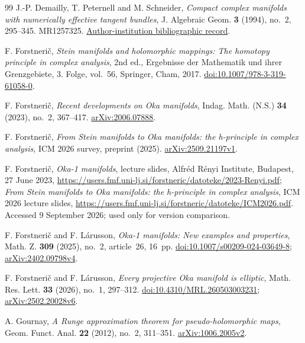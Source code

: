 \documentclass[12pt]{amsart}
\theoremstyle{definition}
\theoremstyle{remark}
\numberwithin{equation}{section}
\begin{document}
\begin{thebibliography}{99}
J.-P. Demailly, T. Peternell and M. Schneider,
\emph{Compact complex manifolds with numerically effective tangent bundles},
J. Algebraic Geom. \textbf{3} (1994), no.~2, 295--345. MR1257325.
\href{https://eref.uni-bayreuth.de/id/eprint/59615/}{Author-institution bibliographic record}.

F. Forstneri\v c,
\emph{Stein manifolds and holomorphic mappings: The homotopy principle in complex analysis},
2nd ed., Ergebnisse der Mathematik und ihrer Grenzgebiete, 3. Folge, vol.~56,
Springer, Cham, 2017.
\href{https://doi.org/10.1007/978-3-319-61058-0}{doi:10.1007/978-3-319-61058-0}.

F. Forstneri\v c, \emph{Recent developments on Oka manifolds},
Indag. Math. (N.S.) \textbf{34} (2023), no.~2, 367--417.
\href{https://arxiv.org/abs/2006.07888}{arXiv:2006.07888}.

F. Forstneri\v c,
\emph{From Stein manifolds to Oka manifolds: the h-principle in complex analysis},
ICM 2026 survey, preprint (2025).
\href{https://arxiv.org/abs/2509.21197v1}{arXiv:2509.21197v1}.

F. Forstneri\v c, \emph{Oka-1 manifolds}, lecture slides,
Alfr\'ed R\'enyi Institute, Budapest, 27 June 2023,
\url{https://users.fmf.uni-lj.si/forstneric/datoteke/2023-Renyi.pdf};
\emph{From Stein manifolds to Oka manifolds: the h-principle in complex analysis},
ICM 2026 lecture slides,
\url{https://users.fmf.uni-lj.si/forstneric/datoteke/ICM2026.pdf}.
Accessed 9 September 2026; used only for version comparison.

F. Forstneri\v c and F. L\'arusson,
\emph{Oka-1 manifolds: New examples and properties},
Math. Z. \textbf{309} (2025), no.~2, article~26, 16~pp.
\href{https://doi.org/10.1007/s00209-024-03649-8}{doi:10.1007/s00209-024-03649-8};
\href{https://arxiv.org/abs/2402.09798v4}{arXiv:2402.09798v4}.

F. Forstneri\v c and F. L\'arusson,
\emph{Every projective Oka manifold is elliptic},
Math. Res. Lett. \textbf{33} (2026), no.~1, 297--312.
\href{https://doi.org/10.4310/MRL.260503003231}{doi:10.4310/MRL.260503003231};
\href{https://arxiv.org/abs/2502.20028v6}{arXiv:2502.20028v6}.

A. Gournay, \emph{A Runge approximation theorem for pseudo-holomorphic maps},
Geom. Funct. Anal. \textbf{22} (2012), no.~2, 311--351.
\href{https://arxiv.org/abs/1006.2005v2}{arXiv:1006.2005v2}.


\end{thebibliography}
\end{document}
